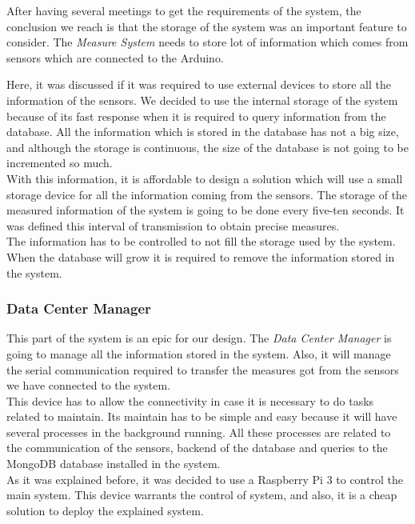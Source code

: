 After having several meetings to get the requirements of the system, the conclusion we reach is that the storage of the system was an important feature to consider. The \textit{Measure System} needs to store lot of information which comes from sensors which are connected to the Arduino.

Here, it was discussed if it was required to use external devices to store all the information of the sensors. We decided to use the internal storage of the system because of its fast response when it is required to query information from the database. All the information which is stored in the database has not a big size, and although the storage is continuous, the size of the database is not going to be incremented so much.\\

With this information, it is affordable to design a solution which will use a small storage device for all the information coming from the sensors. The storage of the measured information of the system is going to be done every five-ten seconds. It was defined this interval of transmission to obtain precise measures.\\

The information has to be controlled to not fill the storage used by the system. When the database will grow it is required to remove the information stored in the system. 

\subsubsection{Data Center Manager}

This part of the system is an epic for our design. The \textit{Data Center Manager} is going to manage all the information stored in the system. Also, it will manage the serial communication required to transfer the measures got from the sensors we have connected to the system.\\

This device has to allow the connectivity in case it is necessary to do tasks related to maintain. Its maintain has to be simple and easy because it will have several processes in the background running. All these processes are related to the communication of the sensors, backend \cite{backend} of the database and queries to the MongoDB database installed in the system.\\

As it was explained before, it was decided to use a Raspberry Pi 3 to control the main system. This device warrants the control of system, and also, it is a cheap solution to deploy the explained system.

